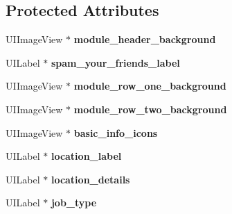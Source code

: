 \subsection*{\-Protected \-Attributes}
\begin{DoxyCompactItemize}
\item 
\hypertarget{interface_basic_company_information_a074125421f5e136d4c293680c1479cb6}{
\-U\-I\-Image\-View $\ast$ {\bfseries module\-\_\-header\-\_\-background}}
\label{interface_basic_company_information_a074125421f5e136d4c293680c1479cb6}

\item 
\hypertarget{interface_basic_company_information_a4d552381cb2f2cb214484164ef11e6d8}{
\-U\-I\-Label $\ast$ {\bfseries spam\-\_\-your\-\_\-friends\-\_\-label}}
\label{interface_basic_company_information_a4d552381cb2f2cb214484164ef11e6d8}

\item 
\hypertarget{interface_basic_company_information_ae7e0d3ca2365293a8edce52deb16adc9}{
\-U\-I\-Image\-View $\ast$ {\bfseries module\-\_\-row\-\_\-one\-\_\-background}}
\label{interface_basic_company_information_ae7e0d3ca2365293a8edce52deb16adc9}

\item 
\hypertarget{interface_basic_company_information_a179a7714eddb9b18c24c9510fa090f09}{
\-U\-I\-Image\-View $\ast$ {\bfseries module\-\_\-row\-\_\-two\-\_\-background}}
\label{interface_basic_company_information_a179a7714eddb9b18c24c9510fa090f09}

\item 
\hypertarget{interface_basic_company_information_af64ab91c3ee9bda6ad74fc6e5714f790}{
\-U\-I\-Image\-View $\ast$ {\bfseries basic\-\_\-info\-\_\-icons}}
\label{interface_basic_company_information_af64ab91c3ee9bda6ad74fc6e5714f790}

\item 
\hypertarget{interface_basic_company_information_a8f4712f9d1b4ffb3b0b03556b87c6643}{
\-U\-I\-Label $\ast$ {\bfseries location\-\_\-label}}
\label{interface_basic_company_information_a8f4712f9d1b4ffb3b0b03556b87c6643}

\item 
\hypertarget{interface_basic_company_information_a07e2cdf547e94510b73ddc3fbd034aa2}{
\-U\-I\-Label $\ast$ {\bfseries location\-\_\-details}}
\label{interface_basic_company_information_a07e2cdf547e94510b73ddc3fbd034aa2}

\item 
\hypertarget{interface_basic_company_information_a338cb68e6f6fb6a8f7f9c0590c64f524}{
\-U\-I\-Label $\ast$ {\bfseries job\-\_\-type}}
\label{interface_basic_company_information_a338cb68e6f6fb6a8f7f9c0590c64f524}


\end{DoxyCompactItemize}
